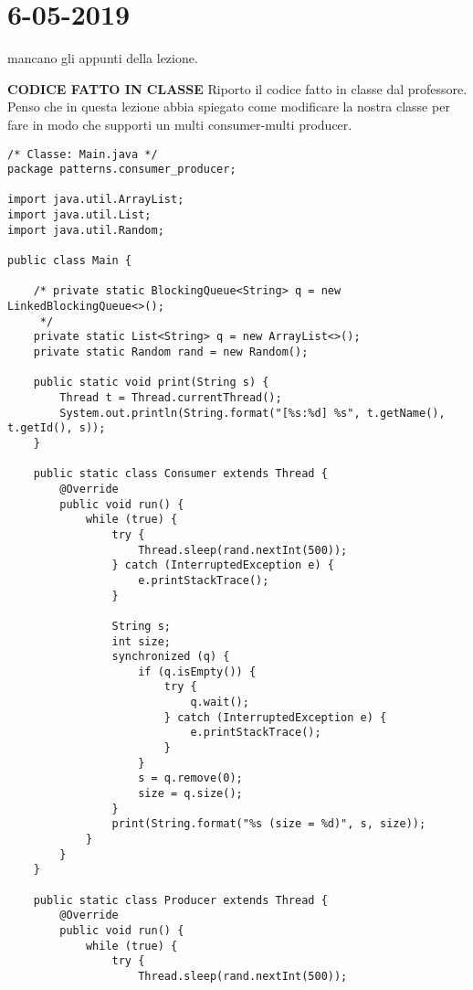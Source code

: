 

\newpage
\section{6-05-2019}
\noindent mancano gli appunti della lezione.


\noindent \textbf{CODICE FATTO IN CLASSE} \newline
Riporto il codice fatto in classe dal professore. \newline
Penso che in questa lezione abbia spiegato come modificare la nostra classe per fare in modo che supporti un multi consumer-multi producer.

\begin{lstlisting}
/* Classe: Main.java */
package patterns.consumer_producer;

import java.util.ArrayList;
import java.util.List;
import java.util.Random;

public class Main {

    /* private static BlockingQueue<String> q = new LinkedBlockingQueue<>();
     */
    private static List<String> q = new ArrayList<>();
    private static Random rand = new Random();

    public static void print(String s) {
        Thread t = Thread.currentThread();
        System.out.println(String.format("[%s:%d] %s", t.getName(), t.getId(), s));
    }

    public static class Consumer extends Thread {
        @Override
        public void run() {
            while (true) {
                try {
                    Thread.sleep(rand.nextInt(500));
                } catch (InterruptedException e) {
                    e.printStackTrace();
                }

                String s;
                int size;
                synchronized (q) {
                    if (q.isEmpty()) {
                        try {
                            q.wait();
                        } catch (InterruptedException e) {
                            e.printStackTrace();
                        }
                    }
                    s = q.remove(0);
                    size = q.size();
                }
                print(String.format("%s (size = %d)", s, size));
            }
        }
    }

    public static class Producer extends Thread {
        @Override
        public void run() {
            while (true) {
                try {
                    Thread.sleep(rand.nextInt(500));


\end{lstlisting}
